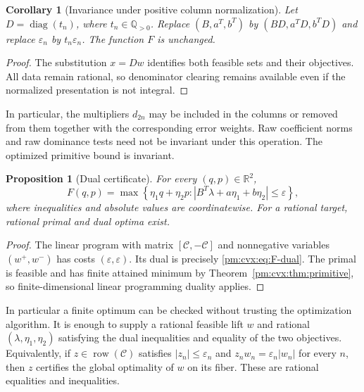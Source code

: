 \documentclass[11pt,a4paper]{article}
\newcommand{\Q}{\mathbb Q}
\newcommand{\R}{\mathbb R}
\newtheorem{proposition}[theorem]{Proposition}
\newtheorem{corollary}[theorem]{Corollary}
\theoremstyle{definition}
\theoremstyle{remark}
\numberwithin{equation}{section}
\begin{document}
\begin{corollary}[Invariance under positive column normalization]
\label{pm:cvx:cor:normalization}
Let $D=\operatorname{diag}(t_n)$, where $t_n\in\Q_{>0}$.
Replace $(B,a^T,b^T)$ by $(BD,a^TD,b^TD)$ and replace
$\varepsilon_n$ by $t_n\varepsilon_n$.  The function $F$ is unchanged.
\end{corollary}
\begin{proof}
The substitution $x=Dw$ identifies both feasible sets and their
objectives.  All data remain rational, so denominator clearing remains
available even if the normalized presentation is not integral.
\end{proof}

In particular, the multipliers $d_{2n}$ may be included in the columns
or removed from them together with the corresponding error weights.
Raw coefficient norms and raw dominance tests need not be invariant
under this operation.  The optimized primitive bound is invariant.

\begin{proposition}[Dual certificate]\label{pm:cvx:prop:dual}
For every $(q,p)\in\R^2$,
\begin{equation}\label{pm:cvx:eq:F-dual}
 F(q,p)=\max\left\{\eta_1q+\eta_2p:
 \left|B^T\lambda+a\eta_1+b\eta_2\right|\le\varepsilon\right\},
\end{equation}
where inequalities and absolute values are coordinatewise.
For a rational target, rational primal and dual optima exist.
\end{proposition}
\begin{proof}
The linear program with matrix $[\mathcal C,-\mathcal C]$ and
nonnegative variables $(w^+,w^-)$ has costs
$(\varepsilon,\varepsilon)$.  Its dual is precisely
\eqref{pm:cvx:eq:F-dual}.  The primal is feasible and has finite attained
minimum by Theorem~\ref{pm:cvx:thm:primitive}, so finite-dimensional linear
programming duality applies.
\end{proof}

In particular a finite optimum can be checked without trusting the
optimization algorithm.  It is enough to supply a rational feasible
lift $w$ and rational $(\lambda,\eta_1,\eta_2)$ satisfying the dual
inequalities and equality of the two objectives.  Equivalently, if
$z\in\operatorname{row}(\mathcal C)$ satisfies
$|z_n|\le\varepsilon_n$ and
$z_nw_n=\varepsilon_n|w_n|$ for every $n$, then $z$ certifies the
global optimality of $w$ on its fiber.  These are rational equalities
and inequalities.
\end{document}
